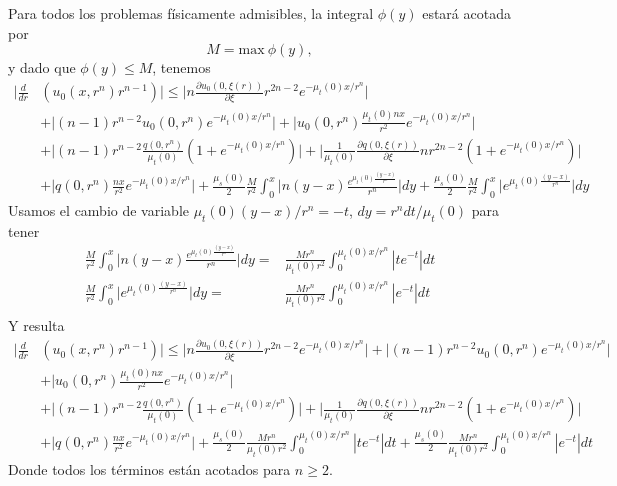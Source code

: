 Para todos los problemas físicamente admisibles, la 
integral $\phi(y)$ estará acotada por
\begin{equation}
M=\text{max}~\phi(y),
\end{equation}
y dado que $\phi(y)\leq M$, tenemos
\begin{equation}
\begin{split}
 \Bigg| \frac{d }{dr}& \left( u_0(x,r^n) r^{n-1} \right) \Bigg| \leq 
 \Bigg| n\frac{\partial u_0(0,\xi(r))}{\partial \xi}r^{2n-2}e^{-\mu_t(0)x/r^n}\Bigg|\\
&+\Bigg| (n-1) r^{n-2}u_0(0,r^n)e^{-\mu_t(0)x/r^n}\Bigg| +\Bigg|u_0(0,r^n)\frac{\mu_t(0)nx}{r^{2}}e^{-\mu_t(0)x/r^n}\Bigg|\\
& + \Bigg|(n-1)r^{n-2}\frac{q(0,r^n)}{\mu_t(0)} \left( 1+e^{-\mu_t(0)x/r^n} \right)\Bigg|+
\Bigg|\frac{1}{\mu_t(0)}\frac{\partial q(0,\xi(r))}{\partial \xi} nr^{2n-2} (1+e^{-\mu_t(0)x/r^n})\Bigg|\\&+\Bigg|q(0,r^n)\frac{nx}{r^{2}}e^{-\mu_t(0)x/r^n}\Bigg|+\frac{\mu_s(0)}{2}\frac{M}{r^2}  \int_0^{x} \Bigg| n(y-x) \frac{e^{\mu_t(0)\frac{(y-x)}{r^n}}}{r^n}\Bigg| dy 
+ \frac{\mu_s(0)}{2} \frac{M}{r^2} \int_0^{x} \Bigg| e^{\mu_t(0)\frac{(y-x)}{r^n}} \Bigg| dy 
\end{split}
\label{eq:bounding2}
\end{equation}
Usamos el cambio de variable $\mu_t(0)(y-x)/r^n=-t$, $dy=r^n dt/\mu_t(0)$ para tener
\begin{equation}
\begin{split}
\frac{M}{r^2}  \int_0^{x} \Bigg| n(y-x) \frac{e^{\mu_t(0)\frac{(y-x)}{r^n}}}{r^n}\Bigg| dy=&\frac{M r^n}{\mu_t(0) r^2}  \int_0^{\mu_t(0)x/r^n} | te^{-t} |dt \\
\frac{M}{r^2} \int_0^{x} \Bigg| e^{\mu_t(0)\frac{(y-x)}{r^n}} \Bigg| dy 
=&\frac{M r^n}{\mu_t(0) r^2}  \int_0^{\mu_t(0) x/r^n} |e^{-t}|dt \\
\end{split}
\label{eq:bounding2aux}
\end{equation}
Y resulta
\begin{equation}
\begin{split}
 \Bigg| \frac{d }{dr}& \left( u_0(x,r^n) r^{n-1} \right) \Bigg| \leq 
 \Bigg| n\frac{\partial u_0(0,\xi(r))}{\partial \xi}r^{2n-2}e^{-\mu_t(0)x/r^n}\Bigg| +\Bigg| (n-1) r^{n-2}u_0(0,r^n)e^{-\mu_t(0)x/r^n}\Bigg|\\
& +\Bigg|u_0(0,r^n)\frac{\mu_t(0)nx}{r^{2}}e^{-\mu_t(0)x/r^n}\Bigg|\\
& + \Bigg|(n-1)r^{n-2}\frac{q(0,r^n)}{\mu_t(0)} \left( 1+e^{-\mu_t(0)x/r^n} \right)\Bigg|+
\Bigg|\frac{1}{\mu_t(0)}\frac{\partial q(0,\xi(r))}{\partial \xi} nr^{2n-2} (1+e^{-\mu_t(0)x/r^n})\Bigg|\\&+\Bigg|q(0,r^n)\frac{nx}{r^{2}}e^{-\mu_t(0)x/r^n}\Bigg|+\frac{\mu_s(0)}{2}\frac{M r^n}{\mu_t(0) r^2}  \int_0^{\mu_t(0)x/r^n} | te^{-t} |dt 
+ \frac{\mu_s(0)}{2} \frac{M r^n}{\mu_t(0)r^2}  \int_0^{\mu_t(0)x/r^n} |e^{-t}|dt
\end{split}
\label{eq:bounding22}
\end{equation}
Donde todos los términos están acotados para $n\geq 2$.

